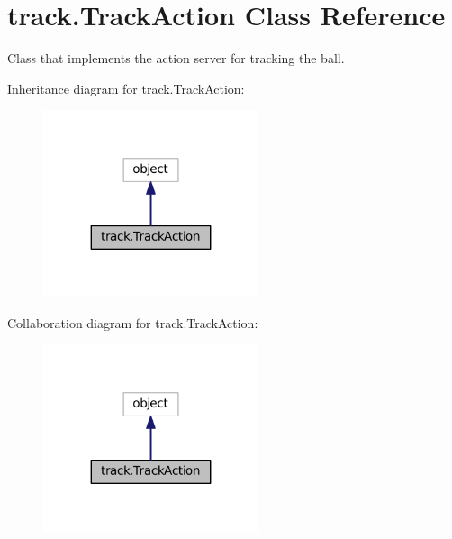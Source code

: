 \hypertarget{classtrack_1_1TrackAction}{}\section{track.\+Track\+Action Class Reference}
\label{classtrack_1_1TrackAction}


Class that implements the action server for tracking the ball.  




Inheritance diagram for track.\+Track\+Action\+:\nopagebreak
\begin{figure}[H]
\begin{center}
\leavevmode
\includegraphics[width=179pt]{classtrack_1_1TrackAction__inherit__graph}
\end{center}
\end{figure}


Collaboration diagram for track.\+Track\+Action\+:\nopagebreak
\begin{figure}[H]
\begin{center}
\leavevmode
\includegraphics[width=179pt]{classtrack_1_1TrackAction__coll__graph}
\end{center}
\end{figure}
